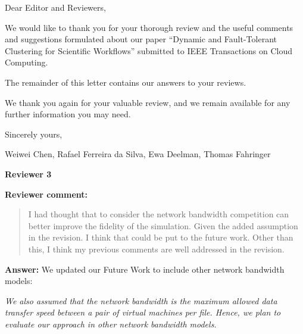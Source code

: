 \documentclass{letter}
\date{Mar 17, 2015}
\newenvironment{review}%
{\textbf{Reviewer comment:}\begin{quote}}%
{\end{quote}}%
\newcommand{\answer}[1]{%
      \textbf{Answer:} #1}
\newcommand{\revised}[1]{\emph{#1}\color{black}}
\begin{document}
\begin{letter}{}

\opening{Dear Editor and Reviewers,}

We would like to thank you for your thorough review and the useful
comments and suggestions formulated about our paper ``Dynamic and Fault-Tolerant Clustering for Scientific Workflows'' submitted to
IEEE Transactions on Cloud Computing.

The remainder of this letter contains our answers to your reviews. 

We thank you again for your valuable review, and we remain available for any further information you may need.

\vspace{0.5cm}

Sincerely yours,

\vspace{1cm}

Weiwei Chen, Rafael Ferreira da Silva, Ewa Deelman, Thomas Fahringer

\newpage

%
%
\textbf{Reviewer 3}

\begin{review}
I had thought that to consider the network bandwidth competition can better improve the fidelity of the simulation. Given the added assumption in the revision. I think that could be put to the future work. Other than this, I think my previous comments are well addressed in the revision.
\end{review}

\answer{We updated our Future Work to include other network bandwidth models:}

\revised{We also assumed that 
the network bandwidth is the maximum allowed data transfer speed between a pair 
of virtual machines per file. Hence, we plan to evaluate our approach in other network 
bandwidth models.}


\end{letter}
\end{document}
